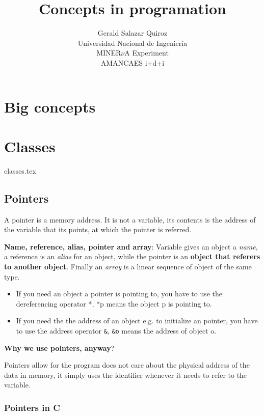 \documentclass[12pt]{article}
\title{Concepts in programation}
\author{Gerald Salazar Quiroz \\
	  Universidad Nacional de Ingeniería \\
	  MINER$\nu$A Experiment \\
	  AMANCAES i+d+i}
\begin{document}
\maketitle
\newpage

\tableofcontents
\newpage

\chapter{Big concepts}


\chapter{Classes}
{classes.tex}



\section{Pointers}
\label{pointers.concepts}


	A pointer is a memory address. It is not a variable, its contents is the
	address of the variable that its points, at which the pointer is referred.

	\textbf{Name, reference, alias, pointer and array}: Variable gives an object a \textsl{name}, a reference is an \textsl{alias} for an object, while the pointer is an \textbf{object that referers to another object}. Finally an \textsl{array} is a linear sequence of object of the same type.

	\begin{itemize}
	\item If you need an object a pointer is pointing to, you have to use the dereferencing operator *, *p means the object p is pointing to.
	\item If you need the the address of an object e.g. to initialize an pointer, you have to use the address operator \verb"&", \verb"&o" means the address of object o.
	\end{itemize}


	\textbf{Why we use pointers, anyway}?

	Pointers allow for the program does not care about the physical address of the data in memory, it simply uses the identifier whenever it needs to refer to the variable.


	\subsection{Pointers in C}
\end{document}
